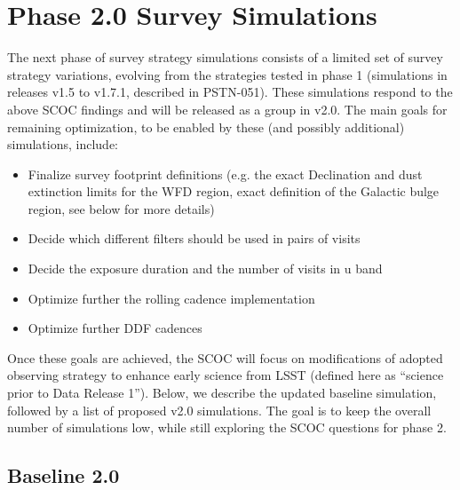 \section{Phase 2.0 Survey Simulations}

The next phase of survey strategy simulations consists of a limited set of survey strategy variations, evolving from the strategies tested in phase 1 (simulations in releases v1.5 to v1.7.1, described in PSTN-051). These simulations respond to the above SCOC findings and will be released as a group in v2.0. The main goals for remaining optimization, to be enabled by these (and possibly additional) simulations,  include:
\begin{itemize}
\item{Finalize survey footprint definitions (e.g. the exact Declination and dust extinction 
            limits for  the WFD region, exact definition of the Galactic bulge region, see below for 
            more details)}
\item{Decide which different filters should be used in pairs of visits}
\item{Decide the exposure duration and the number of visits in u band }
\item{Optimize further the rolling cadence implementation }
\item{Optimize further DDF cadences }
\end{itemize}

Once these goals are achieved, the SCOC will focus on modifications of adopted observing strategy to enhance early science from LSST (defined here as ``science prior to Data Release 1''). Below, we describe the updated baseline simulation, followed by a list of proposed v2.0 simulations. The goal is to keep the overall number of simulations low, while still exploring the SCOC questions for phase 2.

\subsection{Baseline 2.0}

